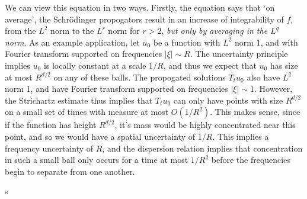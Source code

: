 We can view this equation in two ways. Firstly, the equation says that `on average', the Schr\"{o}dinger propogators result in an increase of integrability of $f$, from the $L^2$ norm to the $L^r$ norm for $r > 2$, \emph{but only by averaging in the $L^q$ norm}. As an example application, let $u_0$ be a function with $L^2$ norm 1, and with Fourier transform supported on frequencies $|\xi| \sim R$. The uncertainty principle implies $u_0$ is locally constant at a scale $1/R$, and thus we expect that $u_0$ has size at most $R^{d/2}$ on any of these balls. The propogated solutions $T_t u_0$ also have $L^2$ norm 1, and have Fourier transform supported on frequencies $|\xi| \sim 1$. However, the Strichartz estimate thus implies that $T_t u_0$ can only have points with size $R^{d/2}$ on a small set of times with measure at most $O(1/R^2)$. This makes sense, since if the function has height $R^{d/2}$, it's mass would be highly concentrated near this point, and so we would have a spatial uncertainty of $1/R$. This implies a frequency uncertainty of $R$, and the dispersion relation implies that concentration in such a small ball only occurs for a time at most $1/R^2$ before the frequencies begin to separate from one another.

\begin{theorem}
	s
\end{theorem}







